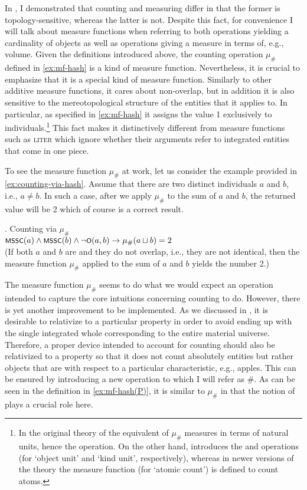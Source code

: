 	In  , I demonstrated that counting and measuring differ in that the former is topology-sensitive, whereas the latter is not. Despite this fact, for convenience I will talk about measure functions when referring to both operations yielding a cardinality of objects as well as operations giving a measure in terms of, e.g., volume. Given the definitions introduced above, the counting operation $\mu_\#$ defined in \ref{ex:mf-hash} is a kind of measure function. Nevertheless, it is crucial to emphasize that it is a special kind of measure function. Similarly to other additive measure functions, it cares about non-overlap, but in addition it is also sensitive to the mereotopological structure of the entities that it applies to. In particular, as specified in \ref{ex:mf-hash} it assigns the value 1 exclusively to  individuals.\footnote{In the original theory of \citet{krifka1989nominal} the equivalent of $\mu_\#$ measures in terms of natural units, hence the  operation. On the other hand, \citet{krifka1995common} introduces the  and  operations (for `object unit' and `kind unit', respectively), whereas in newer versions of the theory \citep[e.g.,][]{krifka2007masses} the  measure function (for `atomic count') is defined to count atoms.} This fact makes it distinctively different from measure functions such as \textsc{liter} which ignore whether their arguments refer to integrated entities that come in one piece.
	
	To see the measure function $\mu_\#$ at work, let us consider the example provided in \ref{ex:counting-via-hash}. Assume that there are two distinct  individuals $a$ and $b$, i.e., $a \neq b$. In such a case, after we apply $\mu_\#$ to the sum of $a$ and $b$, the returned value will be 2 which of course is a correct result.
	
	\ex. Counting via $\mu_\#$\\
	$\cnst{mssc}(a) \wedge \cnst{mssc}(b) \wedge \neg\cnst{o}(a,b) \rightarrow \mu_\#(a \sqcup b) = 2$\\
	(If both $a$ and $b$ are  and they do not overlap, i.e., they are not identical, then the measure function $\mu_\#$ applied to the sum of $a$ and $b$ yields the number 2.)\label{ex:counting-via-hash}
	
	The measure function $\mu_\#$ seems to do what we would expect an operation intended to capture the core intuitions concerning counting to do. However, there is yet another improvement to be implemented. As we discussed in  , it is desirable to relativize  to a particular property in order to avoid ending up with the single integrated whole corresponding to the entire material universe. Therefore, a proper device intended to account for counting should also be relativized to a property so that it does not count absolutely  entities but rather objects that are  with respect to a particular characteristic, e.g., apples. This can be ensured by introducing a new operation to which I will refer as $\#$. As can be seen in the definition in \ref{ex:mf-hash(P)}, it is similar to $\mu_\#$ in that the notion of  plays a crucial role here. 
	
